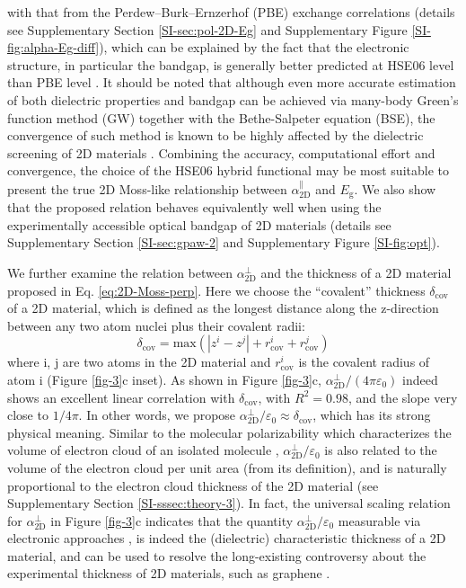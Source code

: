 \documentclass[journal=ancac3,manuscript=article,email=true,hyperref=true,keywords=false]{achemso}
\begin{document}
with that from the Perdew--Burk--Ernzerhof (PBE) exchange correlations
(details see Supplementary Section \ref{SI-sec:pol-2D-Eg} and
Supplementary Figure \ref{SI-fig:alpha-Eg-diff}), which can be
explained by the fact that the electronic structure, in particular the
bandgap, is generally better predicted at HSE06 level than PBE level
\cite{Heyd_2005}. It should be noted that although even more accurate
estimation of both dielectric properties and bandgap can be achieved
via many-body Green’s function method (GW) together with the
Bethe-Salpeter equation (BSE), the convergence of such method is known
to be highly affected by the dielectric screening of 2D materials
\cite{Hueser_2013_2Dvs3D}. Combining the accuracy, computational
effort and convergence, the choice of the HSE06 hybrid functional may
be most suitable to present the true 2D Moss-like relationship between
$\alpha_{\mathrm{2D}}^{\parallel}$ and $E_{\mathrm{g}}$. We also show
that the proposed relation behaves equivalently well when using the
experimentally accessible optical bandgap of 2D materials (details see
Supplementary Section \ref{SI-sec:gpaw-2} and Supplementary Figure
\ref{SI-fig:opt}).

We further examine the relation between $\alpha_{\mathrm{2D}}^{\perp}$ and the
thickness of a 2D material proposed in
Eq. \ref{eq:2D-Moss-perp}. Here we choose the ``covalent'' thickness
$\delta_{\mathrm{cov}}$ of a 2D material, which is defined as the
longest distance along the z-direction between any two atom nuclei
plus their covalent radii:
\begin{equation}
  \label{eq:cov-thick}
  \delta_{\mathrm{cov}} = \mathrm{max}(|z^{i} - z^{j}|
  + r^{i}_{\mathrm{cov}} + r^{j}_{\mathrm{cov}})
\end{equation}
where i, j are two atoms in the 2D material and $r_{\mathrm{cov}}^{i}$
is the covalent radius of atom i (Figure \ref{fig-3}c inset). As shown
in Figure \ref{fig-3}c,
$\alpha_{\mathrm{2D}}^{\perp}/(4 \pi \varepsilon_{0})$ indeed shows an
excellent linear correlation with $\delta_{\mathrm{cov}}$, with
$R^{2}=0.98$, and the slope very close to $1/4\pi$. In other words, we
propose
$\alpha_{\mathrm{2D}}^{\perp} / \varepsilon_{0} \approx
\delta_{\mathrm{cov}}$, which has its strong physical meaning. Similar
to the molecular polarizability which characterizes the volume of
electron cloud of an isolated molecule \cite{Israelachvili_2011},
$\alpha_{\mathrm{2D}}^{\perp}/\varepsilon_{0}$ is also related to the
volume of the electron cloud per unit area (from its definition), and
is naturally proportional to the electron cloud thickness of the 2D
material (see Supplementary Section \ref{SI-sssec:theory-3}). In fact,
the universal scaling relation for $\alpha_{\mathrm{2D}}^{\perp}$ in
Figure \ref{fig-3}c indicates that the quantity
$\alpha_{\mathrm{2D}}^{\perp}/\varepsilon_{0}$ measurable via
electronic approaches
\cite{Antoine_1999,Cherniavskaya_2003,Krauss_1999_EFM}, is indeed the
(dielectric) characteristic thickness of a 2D material, and can be
used to resolve the long-existing controversy about the experimental
thickness of 2D materials, such as graphene \cite{Shearer_2016}.
\end{document}
